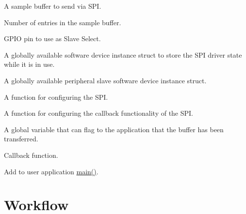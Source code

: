 A sample buffer to send via S\+PI. 
\begin{DoxyCodeInclude}{0}
\end{DoxyCodeInclude}
Number of entries in the sample buffer. 
\begin{DoxyCodeInclude}{0}
\end{DoxyCodeInclude}
G\+P\+IO pin to use as Slave Select. 
\begin{DoxyCodeInclude}{0}
\end{DoxyCodeInclude}
A globally available software device instance struct to store the S\+PI driver state while it is in use. 
\begin{DoxyCodeInclude}{0}
\end{DoxyCodeInclude}
A globally available peripheral slave software device instance struct. 
\begin{DoxyCodeInclude}{0}
\end{DoxyCodeInclude}
A function for configuring the S\+PI. 
\begin{DoxyCodeInclude}{0}
\end{DoxyCodeInclude}
A function for configuring the callback functionality of the S\+PI. 
\begin{DoxyCodeInclude}{0}
\end{DoxyCodeInclude}
A global variable that can flag to the application that the buffer has been transferred. 
\begin{DoxyCodeInclude}{0}
\end{DoxyCodeInclude}
Callback function. 
\begin{DoxyCodeInclude}{0}
\end{DoxyCodeInclude}
 Add to user application {\ttfamily \mbox{\hyperlink{csc__app_8c_a840291bc02cba5474a4cb46a9b9566fe}{main()}}}. 
\begin{DoxyCodeInclude}{0}
\end{DoxyCodeInclude}
 \hypertarget{asfdoc_sam0_sercom_spi_master_callback_use_asfdoc_sam0_sercom_spi_master_callback_use_workflow}{}\section{Workflow}\label{asfdoc_sam0_sercom_spi_master_callback_use_asfdoc_sam0_sercom_spi_master_callback_use_workflow}

